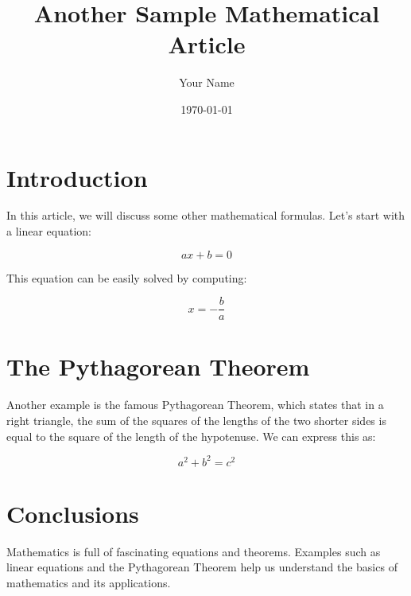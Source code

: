\documentclass{article}
\title{Another Sample Mathematical Article}
\author{Your Name}
\date{\today}
\begin{document}
\maketitle

\section{Introduction}
In this article, we will discuss some other mathematical formulas. Let's start with a linear equation:

\begin{equation}
    ax + b = 0
\end{equation}

This equation can be easily solved by computing:

\begin{equation}
    x = -\frac{b}{a}
\end{equation}

\section{The Pythagorean Theorem}
Another example is the famous Pythagorean Theorem, which states that in a right triangle, the sum of the squares of the lengths of the two shorter sides is equal to the square of the length of the hypotenuse. We can express this as:

\begin{equation}
    a^2 + b^2 = c^2
\end{equation}

\section{Conclusions}
Mathematics is full of fascinating equations and theorems. Examples such as linear equations and the Pythagorean Theorem help us understand the basics of mathematics and its applications.
\end{document}
